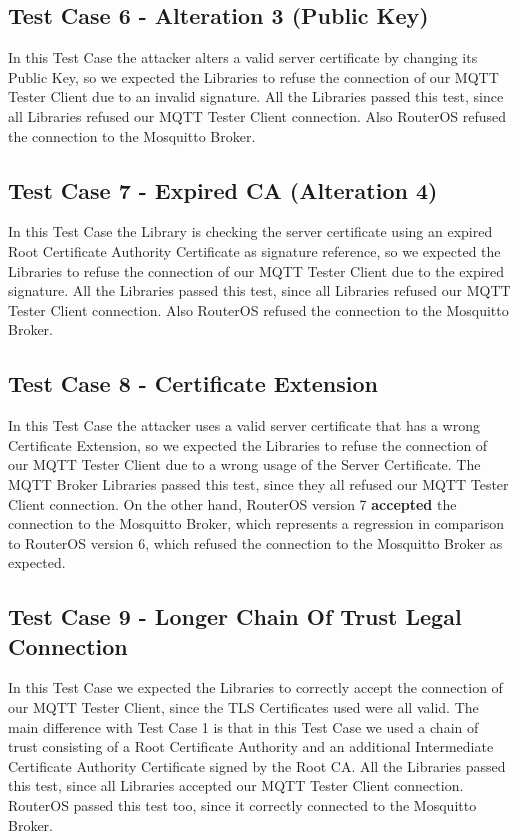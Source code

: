\documentclass[binding=0.6cm,noexaminfo]{sapthesis}
\begin{document}
\subsection{Test Case 6 - Alteration 3 (Public Key)}
In this Test Case the attacker alters a valid server certificate by changing its Public Key, so we expected the Libraries to refuse the connection of our MQTT Tester Client due to an invalid signature. All the Libraries passed this test, since all Libraries refused our MQTT Tester Client connection.
Also RouterOS refused the connection to the Mosquitto Broker.

\subsection{Test Case 7 - Expired CA (Alteration 4)}
In this Test Case the Library is checking the server certificate using an expired Root Certificate Authority Certificate as signature reference, so we expected the Libraries to refuse the connection of our MQTT Tester Client due to the expired signature. All the Libraries passed this test, since all Libraries refused our MQTT Tester Client connection.
Also RouterOS refused the connection to the Mosquitto Broker.

\subsection{Test Case 8 - Certificate Extension}
In this Test Case the attacker uses a valid server certificate that has a wrong Certificate Extension, so we expected the Libraries to refuse the connection of our MQTT Tester Client due to a wrong usage of the Server Certificate. The MQTT Broker Libraries passed this test, since they all refused our MQTT Tester Client connection.
On the other hand, RouterOS version 7 \textbf{accepted} the connection to the Mosquitto Broker, which represents a regression in comparison to RouterOS version 6, which refused the connection to the Mosquitto Broker as expected.

\subsection{Test Case 9 - Longer Chain Of Trust Legal Connection}
In this Test Case we expected the Libraries to correctly accept the connection of our MQTT Tester Client, since the TLS Certificates used were all valid. The main difference with Test Case 1 is that in this Test Case we used a chain of trust consisting of a Root Certificate Authority and an additional Intermediate Certificate Authority Certificate signed by the Root CA. All the Libraries passed this test, since all Libraries accepted our MQTT Tester Client connection.
RouterOS passed this test too, since it correctly connected to the Mosquitto Broker.
\end{document}
